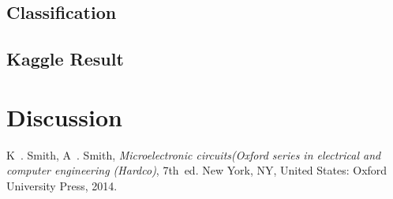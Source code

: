 \documentclass[conference,compsoc]{IEEEtran}
\begin{document}
\subsection{Classification}
\subsection{Kaggle Result}
\section{Discussion}


\begin{thebibliography}{1}

K~. Smith, A~. Smith, \emph{Microelectronic circuits(Oxford series in electrical and computer engineering (Hardco)}, 7th~ed. New York, NY, United States: Oxford University Press, 2014.

\end{thebibliography}

\onecolumn
\end{document}
